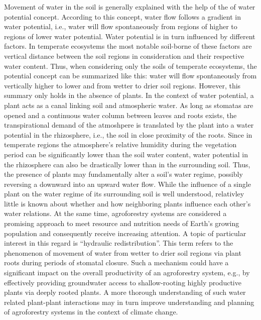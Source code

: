 Movement of water in the soil is generally explained with the help of the of water potential concept.
According to this concept, water flow follows a gradient in water potential, i.e., water will flow spontaneously from regions of higher to regions of lower water potential.
Water potential is in turn influenced by different factors.
In temperate ecosystems the most notable soil-borne of these factors are vertical distance between the soil regions in consideration and their respective water content.
Thus, when considering only the soils of temperate ecosystems, the potential concept can be summarized like this:  water will flow spontaneously from vertically higher to lower and from wetter to drier soil regions.
However, this summary only holds in the absence of plants.
In the context of water potential, a plant acts as a canal linking soil and atmospheric water.
As long as stomatas are opened and a continuous water column between leaves and roots exists, the transpirational demand of the atmoshpere is translated by the plant into a water potential in the rhizosphere, i.e., the soil in close proximity of the roots.
Since in temperate regions the atmosphere’s relative humidity during the vegetation period can be significantly lower than the soil water content, water potential in the rhizosphere can also be drastically lower than in the surrounding soil.
Thus, the presence of plants may fundamentally alter a soil’s water regime, possibly reversing a downward into an upward water flow.
While the influence of a single plant on the water regime of its surrounding soil is well understood, relativley little is known about whether and how neighboring plants influence each other’s water relations.
At the same time, agroforestry systems are considered a promising approach to meet resource and nutrition needs of Earth’s growing population and consequently receive increasing attention.
A topic of particular interest in this regard is ``hydraulic redistribution''.
This term refers to the phenomenon of movement of water from wetter to drier soil regions via plant roots during periods of stomatal closure.
Such a mechanism could have a significant impact on the overall productivity of an agroforestry system, e.g., by effectively providing groundwater access to shallow-rooting highly productive plants via deeply rooted plants.
A more thorough understanding of such water related plant-plant interactions may in turn improve understanding and planning of agroforestry systems in the context of climate change.

